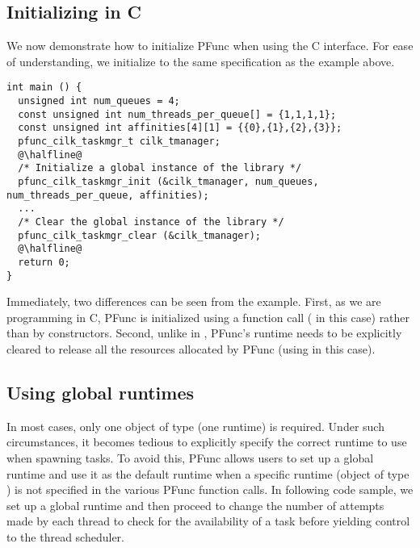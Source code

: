 \subsection{Initializing in C}
\label{sec:c:init}
%
We now demonstrate how to initialize PFunc when using the C interface. 
%
For ease of understanding, we initialize to the same specification as the
\Cpp{} example above.
%
\begin{lstlisting}
int main () {
  unsigned int num_queues = 4;
  const unsigned int num_threads_per_queue[] = {1,1,1,1};
  const unsigned int affinities[4][1] = {{0},{1},{2},{3}};
  pfunc_cilk_taskmgr_t cilk_tmanager;
  @\halfline@
  /* Initialize a global instance of the library */
  pfunc_cilk_taskmgr_init (&cilk_tmanager, num_queues, num_threads_per_queue, affinities);
  ...
  /* Clear the global instance of the library */
  pfunc_cilk_taskmgr_clear (&cilk_tmanager);
  @\halfline@
  return 0;
}
\end{lstlisting}
%
Immediately, two differences can be seen from the \Cpp{} example. 
%
First, as we are programming in C, PFunc is initialized using a function call
( in this case) rather than by constructors.
%
Second, unlike in \Cpp{}, PFunc's runtime needs to be explicitly cleared to
release all the resources allocated by PFunc (using
 in this case).

\subsection{Using global runtimes}
%
In most cases, only one object of type  (one runtime) is
required. 
%
Under such circumstances, it becomes tedious to explicitly specify the correct
runtime to use when spawning tasks. 
%
To avoid this, PFunc allows users to set up a global runtime and use it as the
default runtime when a specific runtime (object of type ) is not
specified in the various PFunc function calls. 
%
In following \Cpp{} code sample, we set up a global runtime and then proceed to
change the number of attempts made by each thread to check for the availability
of a task before yielding control to the thread scheduler.

